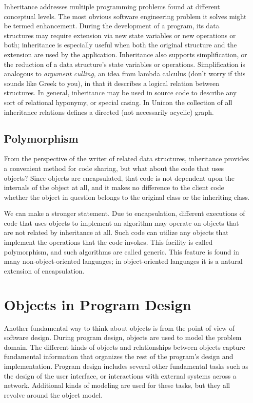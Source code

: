 Inheritance addresses multiple programming problems found at
different conceptual levels. The most obvious software engineering
problem it solves might be termed enhancement. During the development
of a program, its data structures may require extension via new state
variables or new operations or both; inheritance is especially useful
when both the original structure and the extension are used by the
application. Inheritance also supports simplification, or the reduction
of a data structure's state variables or operations.
Simplification is analogous to \textit{argument
culling}\textit{,} an idea from lambda calculus (don't
worry if this sounds like Greek to you), in that it describes a logical
relation between structures. In general, inheritance may be used in
source code to describe any sort of relational hyponymy, or special
casing. In Unicon the collection of all inheritance relations defines a
directed (not necessarily acyclic) graph. 

\subsection*{Polymorphism}

From the perspective of the writer of related data
structures, inheritance provides a convenient method for code sharing,
but what about the code that uses objects? Since objects are
encapsulated, that code is not dependent upon the internals of the
object at all, and it makes no difference to the client code whether
the object in question belongs to the original class or the inheriting
class. 

We can make a stronger statement. Due to encapsulation,
different executions of code that uses objects to implement an
algorithm may operate on objects that are not
related by inheritance at all. Such code can utilize any objects that
implement the operations that the code invokes. This facility is called
polymorphism, and such algorithms are called generic. This feature is
found in many non-object-oriented languages; in object-oriented
languages it is a natural extension of encapsulation. 

\section{Objects in Program Design}

Another fundamental way to think about objects is
from the point of view of software design. During program design,
objects are used to model the problem domain. The different kinds of
objects and relationships between objects capture fundamental
information that organizes the rest of the program's
design and implementation. Program design includes several other
fundamental tasks such as the design of the user interface, or
interactions with external systems across a network. Additional kinds
of modeling are used for these tasks, but they all revolve around the
object model.

